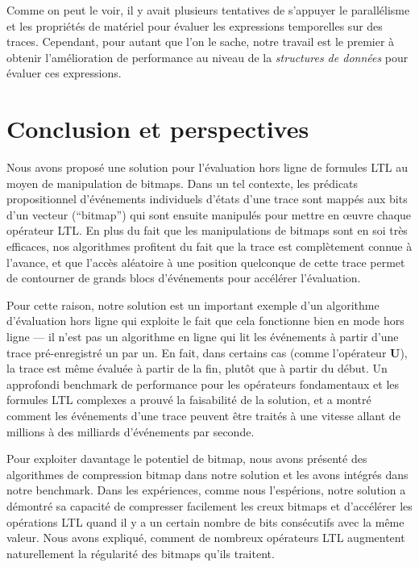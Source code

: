 Comme on peut le voir, il y avait plusieurs tentatives de s'appuyer le parallélisme et les propriétés de matériel pour évaluer les expressions temporelles sur des traces. Cependant, pour autant que l'on le sache, notre travail est le premier à obtenir l'amélioration de performance au niveau de la \emph{structures de données} pour évaluer ces expressions.


\section{Conclusion et perspectives}\label{sec:bm:conclusion} %

Nous avons proposé une solution pour l'évaluation hors ligne de formules LTL au moyen de manipulation de bitmaps. Dans un tel contexte, les prédicats propositionnel d'événements individuels d'états d'une trace sont mappés aux bits d'un vecteur (``bitmap'') qui sont ensuite manipulés pour mettre en \oe{}uvre chaque opérateur LTL. En plus du fait que les manipulations de bitmaps sont en soi très efficaces, nos algorithmes profitent du fait que la trace est complètement connue à l'avance, et que l'accès aléatoire à une position quelconque de cette trace permet de contourner de grands blocs d'événements pour accélérer l'évaluation.

Pour cette raison, notre solution est un important exemple d'un algorithme d'évaluation hors ligne qui exploite le fait que cela fonctionne bien en mode hors ligne --- il n'est pas un algorithme en ligne qui lit les événements à partir d'une trace pré-enregistré un par un. En fait, dans certains cas (comme l'opérateur \textbf{U}), la trace est même évaluée à partir de la fin, plutôt que à partir du début. Un approfondi benchmark de performance pour les opérateurs fondamentaux et les formules LTL complexes a prouvé la faisabilité de la solution, et a montré comment les événements d'une trace peuvent être traités à une vitesse allant de millions à des milliards d'événements par seconde.

Pour exploiter davantage le potentiel de bitmap, nous avons présenté des algorithmes de compression bitmap dans notre solution et les avons intégrés dans notre benchmark. Dans les expériences, comme nous l'espérions, notre solution a démontré sa capacité de compresser facilement les creux bitmaps et d'accélérer les opérations LTL quand il y a un certain nombre de bits consécutifs avec la même valeur. Nous avons expliqué, comment de nombreux opérateurs LTL augmentent naturellement la régularité des bitmaps qu'ils traitent.

